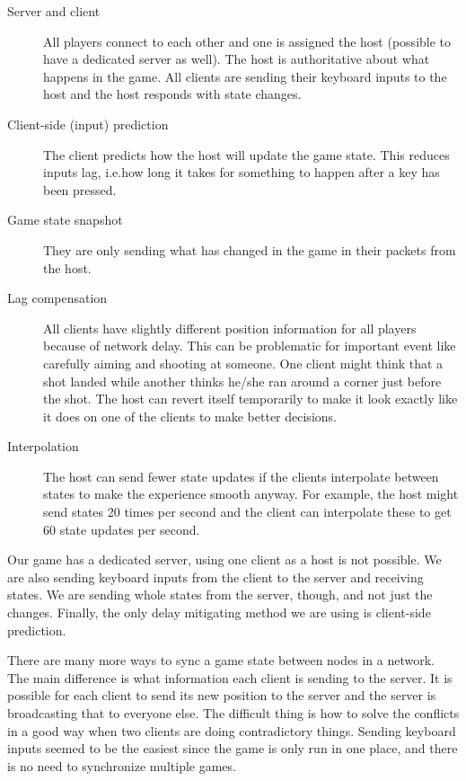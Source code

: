 \documentclass[a4paper]{article}
\begin{document}
\begin{description}
\item [Server and client] All players connect to each other and one is assigned the host (possible to have a dedicated server as well). The host is authoritative about what happens in the game. All clients are sending their keyboard inputs to the host and the host responds with state changes.
\item [Client-side (input) prediction] The client predicts how the host will update the game state. This reduces inputs lag, i.e.\@ how long it takes for something to happen after a key has been pressed.
\item [Game state snapshot] They are only sending what has changed in the game in their packets from the host.
\item [Lag compensation] All clients have slightly different position information for all players because of network delay. This can be problematic for important event like carefully aiming and shooting at someone. One client might think that a shot landed while another thinks he/she ran around a corner just before the shot. The host can revert itself temporarily to make it look exactly like it does on one of the clients to make better decisions.
\item [Interpolation] The host can send fewer state updates if the clients interpolate between states to make the experience smooth anyway. For example, the host might send states 20 times per second and the client can interpolate these to get 60 state updates per second.
\end{description}

Our game has a dedicated server, using one client as a host is not possible. We are also sending keyboard inputs from the client to the server and receiving states. We are sending whole states from the server, though, and not just the changes. Finally, the only delay mitigating method we are using is client-side prediction.

There are many more ways to sync a game state between nodes in a network. The main difference is what information each client is sending to the server. It is possible for each client to send its new position to the server and the server is broadcasting that to everyone else. The difficult thing is how to solve the conflicts in a good way when two clients are doing contradictory things. Sending keyboard inputs seemed to be the easiest since the game is only run in one place, and there is no need to synchronize multiple games.
\end{document}
